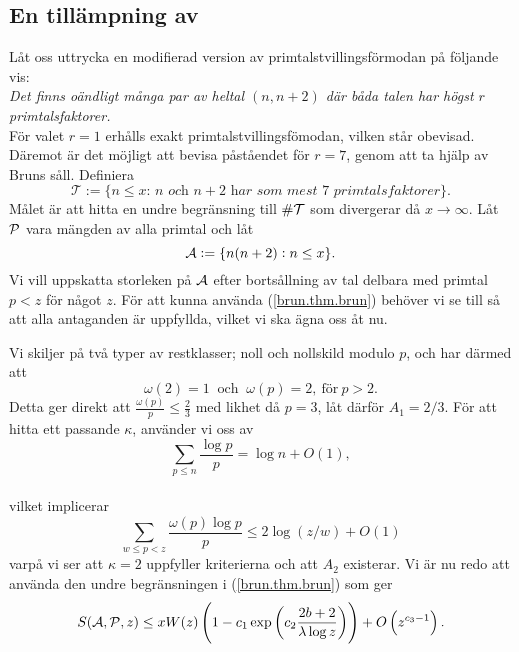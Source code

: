 


\subsection{En tillämpning av}
Låt oss uttrycka en modifierad version av primtalstvillingsförmodan på följande vis:\\
\textit{Det finns oändligt många par av heltal $(n,n+2)$ där båda talen har högst $r$ primtalsfaktorer.}\\
För valet $r=1$ erhålls exakt primtalstvillingsfömodan, vilken står obevisad.
Däremot är det möjligt att bevisa påståendet för $r=7$, genom att ta hjälp av Bruns såll.
Definiera
\begin{equation*}
    \mathcal{T} := \{\textit{$n\leq x$: $n$ och $n+2$ har som mest $7$ primtalsfaktorer}\}.
\end{equation*}
Målet är att hitta en undre begränsning till $\card{\mathcal{T}}$ som divergerar då $x\to\infty$.
Låt $\P$ vara mängden av alla primtal och låt
\begin{equation*}
    \A := \{n(n+2): n\leq x\}.
\end{equation*}
Vi vill uppskatta storleken på $\A$ efter bortsållning av tal delbara med primtal $p<z$ för något $z$.
För att kunna använda (\ref{brun.thm.brun}) behöver vi se till så att alla antaganden är uppfyllda, vilket vi ska ägna oss åt nu.


Vi skiljer på två typer av restklasser; noll och nollskild modulo $p$, och har därmed att
\begin{equation*}
    \omega(2)=1\ \text{ och }\ \omega(p)=2,\ \text{för}\ p>2.
\end{equation*}
Detta ger direkt att $\frac{\omega(p)}{p}\leq\frac{2}{3}$ med likhet då $p=3$, låt därför $A_1=2/3$.
För att hitta ett passande $\kappa$, använder vi oss av
\begin{equation}\label{brun.eq.sum_logp_over_p}
    \sum_{p\leq n}\frac{\log p}{p} = \log n + O(1),
\end{equation}
 \\ \noindent
vilket implicerar
\begin{equation*}
    \sum_{w\leq p<z} \frac{\omega(p)\log p}{p} \leq 2\log\left(z/w\right) + O(1)
\end{equation*}
varpå vi ser att $\kappa=2$ uppfyller kriterierna och att $A_2$ existerar.
Vi är nu redo att använda den undre begränsningen i (\ref{brun.thm.brun}) som ger
\begin{align*}
    \S{A}{P}{z} \leq xW(z)\left(1 - c_1\exp\left(c_2\frac{2b+2}{\lambda\log z}\right)\right) + O\left(z^{c_3 - 1}\right).
\end{align*}



